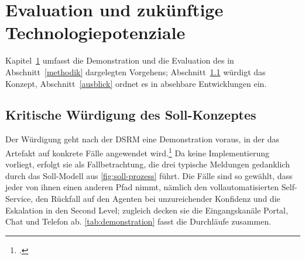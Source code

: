 \section{Evaluation und zukünftige Technologiepotenziale}
\label{evaluation}

Kapitel~\ref{evaluation} umfasst die Demonstration und die Evaluation des in Abschnitt~\ref{methodik} dargelegten Vorgehens; Abschnitt~\ref{wuerdigung} w\"urdigt das Konzept, Abschnitt~\ref{ausblick} ordnet es in absehbare Entwicklungen ein.

\subsection{Kritische Würdigung des Soll-Konzeptes}
\label{wuerdigung}

Der W\"urdigung geht nach der DSRM eine Demonstration voraus, in der das Artefakt auf konkrete F\"alle angewendet wird.\footcite[Vgl.][S.~55]{Peffers2007} Da keine Implementierung vorliegt, erfolgt sie als Fallbetrachtung, die drei typische Meldungen gedanklich durch das Soll-Modell aus \autoref{fig:soll-prozess} f\"uhrt. Die F\"alle sind so gew\"ahlt, dass jeder von ihnen einen anderen Pfad nimmt, n\"amlich den vollautomatisierten Self-Service, den R\"uckfall auf den Agenten bei unzureichender Konfidenz und die Eskalation in den Second Level; zugleich decken sie die Eingangskan\"ale Portal, Chat und Telefon ab. \autoref{tab:demonstration} fasst die Durchl\"aufe zusammen.


